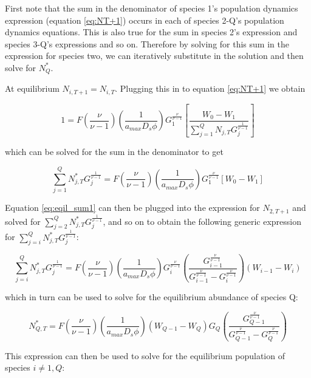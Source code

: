 \documentclass{article}
\begin{document}
  First note that the sum in the denominator of species 1's population dynamics
  expression (equation \ref{eq:NT+1}) occurs in each of species 2-Q's population
  dynamics equations. This is also true for the sum in species 2's expression
  and species 3-Q's expressions and so on. Therefore by solving for this sum in
  the expression for species two, we can iteratively substitute in the solution
  and then solve for $N_{Q}^{*}$.

  At equilibrium $N_{i, T+1} = N_{i, T}$. Plugging this in to
  equation \ref{eq:NT+1} we obtain

  $$ 1 = F(\frac{\nu}{\nu - 1})(\frac{1}{a_{max}D_{s}\phi})G_{1}^{\frac{\nu}{\nu-1}}\left[ \frac{W_{0} - W_{1}}{\sum_{j = 1}^{Q}N_{j,T}G_{j}^{\frac{1}{\nu-1}}} \right] $$


  which can be solved for the sum in the denominator to get

  \begin{equation} \label{eq:equil_sum1}
    \sum_{j = 1}^{Q}N_{j,T}^{*}G_{j}^{\frac{1}{\nu-1}} = F(\frac{\nu}{\nu - 1})(\frac{1}{a_{max}D_{s}\phi})G_{1}^{\frac{\nu}{\nu - 1}}[W_{0} - W_{1}]
  \end{equation}

  Equation \ref{eq:eqil_sum1} can then be plugged into the expression for $N_{2, T+1}$ and
  solved for $\sum_{j = 2}^{Q}N_{j,T}^{*}G_{j}^{\frac{1}{\nu-1}}$, and so on to
  obtain the following generic expression for
  $\sum_{j = i}^{Q}N_{j, T}^{*}G_{j}^{\frac{1}{\nu - 1}}$:

  \begin{dmath} \label{eq:equil_sum}
    \sum_{j = i}^{Q}N_{j, T}^{*}G_{j}^{\frac{1}{\nu - 1}} = F(\frac{\nu}{\nu - 1})(\frac{1}{a_{max}D_{s}\phi})G_{i}^{\frac{\nu}{\nu - 1}}\left(\frac{G_{i-1}^{\frac{\nu}{\nu-1}}}{G_{i-1}^{\frac{\nu}{\nu-1}} - G_{i}^{\frac{\nu}{\nu-1}}} \right)(W_{i-1} - W_{i})
  \end{dmath}

  which in turn can be used to solve for the equilibrium abundance of
  species Q:

  \begin{equation} \label{eq:NstarQ}
   N_{Q, T}^{*} = F(\frac{\nu}{\nu - 1})(\frac{1}{a_{max}D_{s}\phi})(W_{Q-1} - W_{Q})G_{Q}(\frac{G_{Q-1}^{\frac{\nu}{\nu-1}}}{G_{Q-1}^{\frac{\nu}{\nu-1}} - G_{Q}^{\frac{\nu}{\nu-1}}})
 \end{equation}

  This expression can then be used to solve for the equilibrium population of
  species $i \neq 1, Q$:
\end{document}
